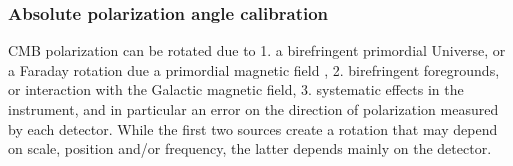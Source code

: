 \documentclass[PICOReport.tex]{subfiles}
\begin{document}
%

\subsubsection{Absolute polarization angle calibration}
\label{sec:angle}

CMB polarization can be rotated due to 1. a birefringent primordial Universe, or a Faraday rotation
due a primordial magnetic field \citep{Pogosian+2018}, 2. birefringent
foregrounds, or interaction with the Galactic magnetic field,
3. systematic effects in the instrument, and in particular an error on
the direction of polarization measured by each detector.  
While the first two sources create a rotation that may depend on scale,
position and/or frequency, the latter depends mainly on
the detector. 
\end{document}
